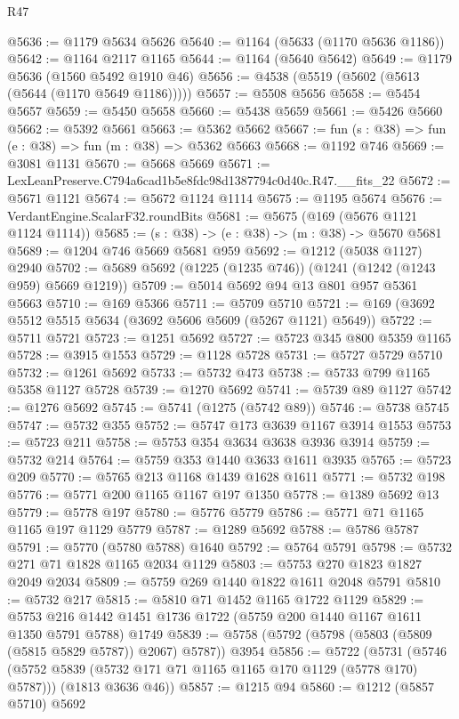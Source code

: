 \begin{lexlean}{R47}
\begin{coremodule}
@5636 := @1179 @5634 @5626
@5640 := @1164 (@5633 (@1170 @5636 @1186))
@5642 := @1164 @2117 @1165
@5644 := @1164 (@5640 @5642)
@5649 := @1179 @5636 (@1560 @5492 @1910 @46)
@5656 := @4538 (@5519 (@5602 (@5613 (@5644 (@1170 @5649 @1186)))))
@5657 := @5508 @5656
@5658 := @5454 @5657
@5659 := @5450 @5658
@5660 := @5438 @5659
@5661 := @5426 @5660
@5662 := @5392 @5661
@5663 := @5362 @5662
@5667 := fun (s : @38) => fun (e : @38) => fun (m : @38) => @5362 @5663
@5668 := @1192 @746
@5669 := @3081 @1131
@5670 := @5668 @5669
@5671 := LexLeanPreserve.C794a6cad1b5e8fdc98d1387794c0d40c.R47.__fits_22
@5672 := @5671 @1121
@5674 := @5672 @1124 @1114
@5675 := @1195 @5674
@5676 := VerdantEngine.ScalarF32.roundBits
@5681 := @5675 (@169 (@5676 @1121 @1124 @1114))
@5685 := (s : @38) -> (e : @38) -> (m : @38) -> @5670 @5681
@5689 := @1204 @746 @5669 @5681 @959
@5692 := @1212 (@5038 @1127) @2940
@5702 := @5689 @5692 (@1225 (@1235 @746)) (@1241 (@1242 (@1243 @959) @5669 @1219))
@5709 := @5014 @5692 @94 @13 @801 @957 @5361 @5663
@5710 := @169 @5366
@5711 := @5709 @5710
@5721 := @169 (@3692 @5512 @5515 @5634 (@3692 @5606 @5609 (@5267 @1121) @5649))
@5722 := @5711 @5721
@5723 := @1251 @5692
@5727 := @5723 @345 @800 @5359 @1165
@5728 := @3915 @1553
@5729 := @1128 @5728
@5731 := @5727 @5729 @5710
@5732 := @1261 @5692
@5733 := @5732 @473
@5738 := @5733 @799 @1165 @5358 @1127 @5728
@5739 := @1270 @5692
@5741 := @5739 @89 @1127
@5742 := @1276 @5692
@5745 := @5741 (@1275 (@5742 @89))
@5746 := @5738 @5745
@5747 := @5732 @355
@5752 := @5747 @173 @3639 @1167 @3914 @1553
@5753 := @5723 @211
@5758 := @5753 @354 @3634 @3638 @3936 @3914
@5759 := @5732 @214
@5764 := @5759 @353 @1440 @3633 @1611 @3935
@5765 := @5723 @209
@5770 := @5765 @213 @1168 @1439 @1628 @1611
@5771 := @5732 @198
@5776 := @5771 @200 @1165 @1167 @197 @1350
@5778 := @1389 @5692 @13
@5779 := @5778 @197
@5780 := @5776 @5779
@5786 := @5771 @71 @1165 @1165 @197 @1129 @5779
@5787 := @1289 @5692
@5788 := @5786 @5787
@5791 := @5770 (@5780 @5788) @1640
@5792 := @5764 @5791
@5798 := @5732 @271 @71 @1828 @1165 @2034 @1129
@5803 := @5753 @270 @1823 @1827 @2049 @2034
@5809 := @5759 @269 @1440 @1822 @1611 @2048 @5791
@5810 := @5732 @217
@5815 := @5810 @71 @1452 @1165 @1722 @1129
@5829 := @5753 @216 @1442 @1451 @1736 @1722 (@5759 @200 @1440 @1167 @1611 @1350 @5791 @5788) @1749
@5839 := @5758 (@5792 (@5798 (@5803 (@5809 (@5815 @5829 @5787)) @2067) @5787)) @3954
@5856 := @5722
    (@5731
      (@5746 (@5752 @5839 (@5732 @171 @71 @1165 @1165 @170 @1129 (@5778 @170) @5787)))
      (@1813 @3636 @46))
@5857 := @1215 @94
@5860 := @1212 (@5857 @5710) @5692

\end{coremodule}
\end{lexlean}
